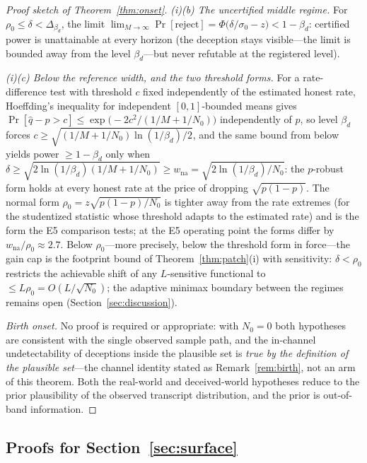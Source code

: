 \begin{proof}[Proof sketch of Theorem~\ref{thm:onset}]
\emph{(i)(b) The uncertified middle regime.} For
$\rho_0\le\delta<\Delta_{\beta_d}$, the limit
$\lim_{M\to\infty}\Pr[\mathrm{reject}]
=\Phi\!\bigl(\delta/\sigma_0-z\bigr)<1-\beta_d$: certified power is
unattainable at every horizon (the deception stays visible---the limit is
bounded away from the level $\beta_d$---but never refutable at the
registered level).

\emph{(i)(c) Below the reference width, and the two threshold forms.}
For a rate-difference test with threshold $c$ fixed independently of the
estimated honest rate, Hoeffding's inequality for independent
$[0,1]$-bounded means gives
$\Pr[\hat q-\hat p>c]\le\exp\bigl(-2c^{2}/(1/M+1/N_0)\bigr)$
independently of $p$, so level $\beta_d$ forces
$c\ge\sqrt{(1/M+1/N_0)\ln(1/\beta_d)/2}$, and the same bound from below
yields power $\ge1-\beta_d$ only when
$\delta\ge\sqrt{2\ln(1/\beta_d)(1/M+1/N_0)}
\ge w_{\mathrm{na}}=\sqrt{2\ln(1/\beta_d)/N_0}$: the $p$-robust form holds
at every honest rate at the price of dropping $\sqrt{p(1-p)}$. The normal
form $\rho_0=z\sqrt{p(1-p)/N_0}$ is tighter away from the rate extremes
(for the studentized statistic whose threshold adapts to the estimated
rate) and is the form the E5 comparison tests; at the E5 operating point
the forms differ by $w_{\mathrm{na}}/\rho_0\approx2.7$. Below
$\rho_0$---more precisely, below the threshold form in force---the gain
cap is the footprint bound of Theorem~\ref{thm:patch}(i) with
sensitivity: $\delta<\rho_0$ restricts the achievable shift of any
$L$-sensitive functional to $\le L\rho_0=O(L/\sqrt{N_0})$; the adaptive
minimax boundary between the regimes remains open
(Section~\ref{sec:discussion}).

\emph{Birth onset.} No proof is required or appropriate: with $N_0=0$
both hypotheses are consistent with the single observed sample path, and
the in-channel undetectability of deceptions inside the plausible set is
\emph{true by the definition of the plausible set}---the channel identity
stated as Remark~\ref{rem:birth}, not an arm of this theorem. Both the
real-world and deceived-world hypotheses reduce to the prior plausibility
of the observed transcript distribution, and the prior is out-of-band
information.
\end{proof}

\subsection{Proofs for Section~\ref{sec:surface}}\label{app:limits}

